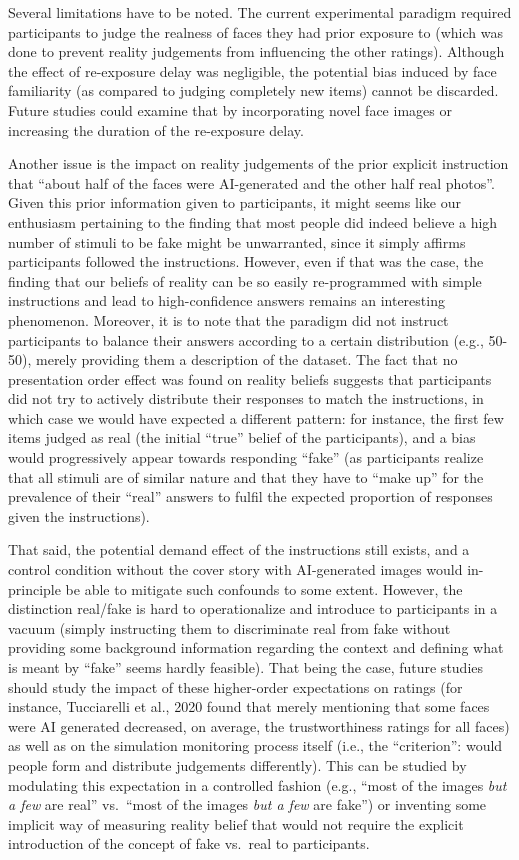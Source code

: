 \documentclass[
  man,floatsintext]{apa6}
\begin{document}
Several limitations have to be noted. The current experimental paradigm required participants to judge the realness of faces they had prior exposure to (which was done to prevent reality judgements from influencing the other ratings). Although the effect of re-exposure delay was negligible, the potential bias induced by face familiarity (as compared to judging completely new items) cannot be discarded. Future studies could examine that by incorporating novel face images or increasing the duration of the re-exposure delay.

Another issue is the impact on reality judgements of the prior explicit instruction that ``about half of the faces were AI-generated and the other half real photos''. Given this prior information given to participants, it might seems like our enthusiasm pertaining to the finding that most people did indeed believe a high number of stimuli to be fake might be unwarranted, since it simply affirms participants followed the instructions. However, even if that was the case, the finding that our beliefs of reality can be so easily re-programmed with simple instructions and lead to high-confidence answers remains an interesting phenomenon. Moreover, it is to note that the paradigm did not instruct participants to balance their answers according to a certain distribution (e.g., 50-50), merely providing them a description of the dataset. The fact that no presentation order effect was found on reality beliefs suggests that participants did not try to actively distribute their responses to match the instructions, in which case we would have expected a different pattern: for instance, the first few items judged as real (the initial ``true'' belief of the participants), and a bias would progressively appear towards responding ``fake'' (as participants realize that all stimuli are of similar nature and that they have to ``make up'' for the prevalence of their ``real'' answers to fulfil the expected proportion of responses given the instructions).

That said, the potential demand effect of the instructions still exists, and a control condition without the cover story with AI-generated images would in-principle be able to mitigate such confounds to some extent. However, the distinction real/fake is hard to operationalize and introduce to participants in a vacuum (simply instructing them to discriminate real from fake without providing some background information regarding the context and defining what is meant by ``fake'' seems hardly feasible). That being the case, future studies should study the impact of these higher-order expectations on ratings (for instance, Tucciarelli et al., 2020 found that merely mentioning that some faces were AI generated decreased, on average, the trustworthiness ratings for all faces) as well as on the simulation monitoring process itself (i.e., the ``criterion'': would people form and distribute judgements differently). This can be studied by modulating this expectation in a controlled fashion (e.g., ``most of the images \emph{but a few} are real'' vs.~``most of the images \emph{but a few} are fake'') or inventing some implicit way of measuring reality belief that would not require the explicit introduction of the concept of fake vs.~real to participants.
\end{document}
